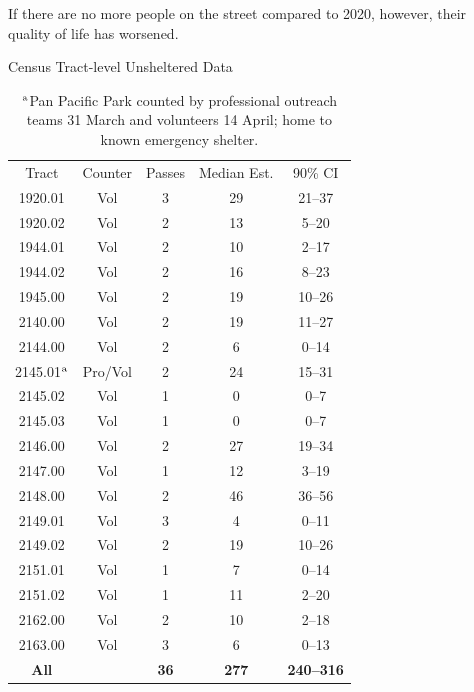 \documentclass[11pt]{article}
\begin{document}
If there are no more people on the street compared to 2020, however, their quality of life has worsened. \begin{table}
\caption{Census Tract-level Unsheltered Data}
\centering
\begin{tabular}{ccccc}
\toprule
Tract & Counter & Passes & Median Est. & 90\% CI \\ \cmidrule{1-5}
1920.01 & Vol & 3 & 29 & 21--37 \\
1920.02 & Vol & 2 & 13 & 5--20 \\
1944.01 & Vol & 2 & 10 & 2--17 \\
1944.02 & Vol & 2 & 16 & 8--23 \\
1945.00 & Vol & 2 & 19 & 10--26 \\
2140.00 & Vol & 2 & 19 & 11--27 \\
2144.00 & Vol & 2 & 6 & 0--14 \\
2145.01$^{\rm a}$ & Pro/Vol & 2 & 24 & 15--31 \\
2145.02 & Vol & 1 & 0 & 0--7 \\
2145.03 & Vol & 1 & 0 & 0--7 \\
2146.00 & Vol & 2 & 27 & 19--34 \\
2147.00 & Vol & 1 & 12 & 3--19 \\
2148.00 & Vol & 2 & 46 & 36--56 \\
2149.01 & Vol & 3 & 4 & 0--11 \\
2149.02 & Vol & 2 & 19 & 10--26 \\
2151.01 & Vol & 1 & 7 & 0--14 \\
2151.02 & Vol & 1 & 11 & 2--20 \\
2162.00 & Vol & 2 & 10 & 2--18 \\
2163.00 & Vol & 3 & 6 & 0--13 \\
\cmidrule{1-5}
{\bf All} & & {\bf 36} & {\bf 277} & {\bf 240--316}
\\ \bottomrule
\end{tabular}
\caption*{$^{\rm a}$Pan Pacific Park counted by professional outreach teams
31 March and volunteers 14 April; home to known emergency shelter.}
\label{tbl:allTracts}
\end{table}
\end{document}
